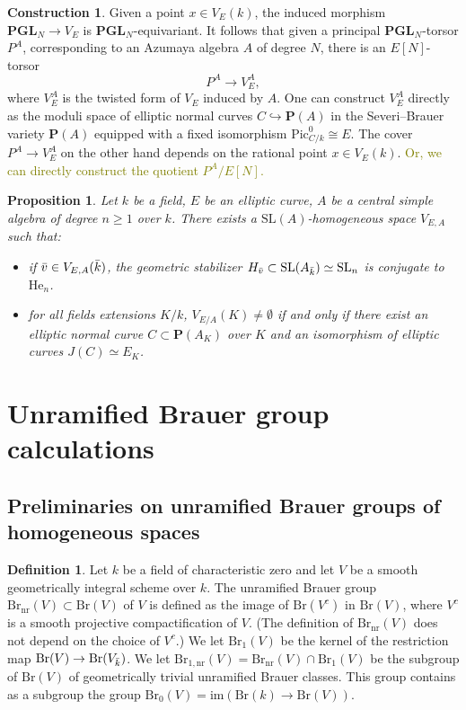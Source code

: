 \documentclass[10pt,letterpaper,twoside]{article}
\newcommand{\BA}[1]{\textcolor{olive}{#1}}
\renewcommand{\1}{\mathbf{1}}
\newcommand{\bP}{\mathbf{P}}
\newcommand{\nr}{\mathrm{nr}}
\newcommand{\im}{\mathrm{im}}
\renewcommand{\geq}{\geqslant}
\newcommand{\PGL}{\mathbf{PGL}}
\newcommand{\Pic}{\mathrm{Pic}}
\newcommand{\Br}{\mathrm{Br}}
\newcommand{\iso}{\cong}
\theoremstyle{plain}
\newtheorem{proposition}[theorem]{Proposition}
\theoremstyle{plain}
\theoremstyle{definition}
\theoremstyle{named}
\theoremstyle{definition}
\newtheorem{definition}[theorem]{Definition}
\newtheorem{construction}[theorem]{Construction}
\begin{document}
\begin{construction}
    Given a point $x\in V_E(k)$, the induced morphism $\PGL_N\rightarrow V_E$ is
    $\PGL_N$-equivariant. It follows that given a principal $\PGL_N$-torsor $P^A$, corresponding to
    an Azumaya algebra $A$ of degree $N$, there is an $E[N]$-torsor $$P^A\rightarrow V_E^A,$$
    where $V_E^A$ is the twisted form of $V_E$ induced by $A$. One can construct $V_E^A$ directly as
    the moduli space of elliptic normal curves $C\hookrightarrow\bP(A)$ in the Severi--Brauer
    variety $\bP(A)$ equipped with a fixed isomorphism $\Pic^0_{C/k}\iso E$.
    The cover $P^A\rightarrow V_E^A$ on the other hand depends on the rational point $x\in V_E(k)$.
    \BA{Or, we can directly construct the quotient $P^A/E[N]$.}
\end{construction}


\begin{proposition}
    Let $k$ be a field, $E$ be an elliptic curve, $A$ be a central simple algebra of degree $n\geq 1$ over $k$. There exists a $\mathrm{SL}(A)$-homogeneous space $V_{E,A}$ such that:
    \begin{itemize}
    \item if $\Bar{v}\in V_{E,A}(\Bar{k})$, the geometric stabilizer $H_{\Bar{v}}\subset \mathrm{SL}(A_{\Bar{k}})\simeq \mathrm{SL}_n$ is conjugate to $\mathrm{He}_n$. 
    \item for all fields extensions $K/k$, $V_{E/A}(K)\neq\emptyset$ if and only if there exist an elliptic normal curve $C\subset \bP(A_K)$ over $K$ and an isomorphism of elliptic curves $J(C)\simeq E_K$.
    \end{itemize}
\end{proposition}


	\section{Unramified Brauer group calculations}

\subsection{Preliminaries on unramified Brauer groups of homogeneous spaces}

\begin{definition}
	Let $k$ be a field of characteristic zero and let $V$ be a smooth geometrically integral scheme over $k$. The unramified Brauer group $\Br_{\nr}(V)\subset \Br(V)$ of $V$ is defined as the image of $\Br(V^c)$ in $\Br(V)$, where $V^c$ is a smooth projective compactification of $V$. (The definition of $\Br_{\nr}(V)$ does not depend on the choice of $V^c$.) We
	let $\Br_1(V)$ be the kernel of the restriction map $\Br(V)\to \Br(V_{\Bar{k}})$. We let $\Br_{1,\nr}(V)=\Br_\nr(V)\cap\Br_1(V)$ be the subgroup of $\Br(V)$ of geometrically trivial unramified Brauer classes. This group contains as a
	subgroup the group $\Br_0(V)=\im(\Br(k)\rightarrow\Br(V))$.
\end{definition}
\end{document}
